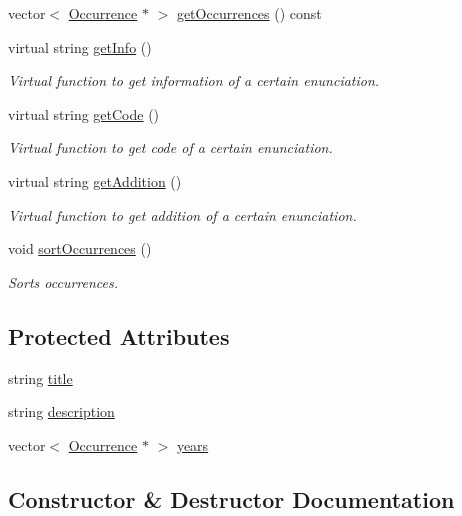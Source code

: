 \begin{DoxyCompactItemize}
vector$<$ \hyperlink{class_occurrence}{Occurrence} $\ast$ $>$ \hyperlink{class_enunciation_a8fe49ff095b219adb6841976b8983ebe}{get\+Occurrences} () const
\item 
virtual string \hyperlink{class_enunciation_a032b5ff494595ab52d152d605544525c}{get\+Info} ()
\begin{DoxyCompactList}\small\item\em Virtual function to get information of a certain enunciation. \end{DoxyCompactList}\item 
virtual string \hyperlink{class_enunciation_a2c27d4c83302dd7d21e1064c9e4ec97d}{get\+Code} ()
\begin{DoxyCompactList}\small\item\em Virtual function to get code of a certain enunciation. \end{DoxyCompactList}\item 
virtual string \hyperlink{class_enunciation_ad0bf6d8d34f6246cd5bc674b15b5958b}{get\+Addition} ()
\begin{DoxyCompactList}\small\item\em Virtual function to get addition of a certain enunciation. \end{DoxyCompactList}\item 
void \hyperlink{class_enunciation_a1ae5e84684d7aea08b888836661c0a01}{sort\+Occurrences} ()
\begin{DoxyCompactList}\small\item\em Sorts occurrences. \end{DoxyCompactList}\end{DoxyCompactItemize}
\subsection*{Protected Attributes}
\begin{DoxyCompactItemize}
\item 
string \hyperlink{class_enunciation_a5e2accd01df4c81578dc8f7b83507167}{title}
\item 
string \hyperlink{class_enunciation_a0b30051b66bd07b227f6a227befb6c0c}{description}
\item 
vector$<$ \hyperlink{class_occurrence}{Occurrence} $\ast$ $>$ \hyperlink{class_enunciation_a54cce81b8d17a0e2f06d651988507a4a}{years}
\end{DoxyCompactItemize}


\subsection{Constructor \& Destructor Documentation}
\mbox{\label{class_enunciation_a78a6f3656b8d057dfef51593de59193f}} 
